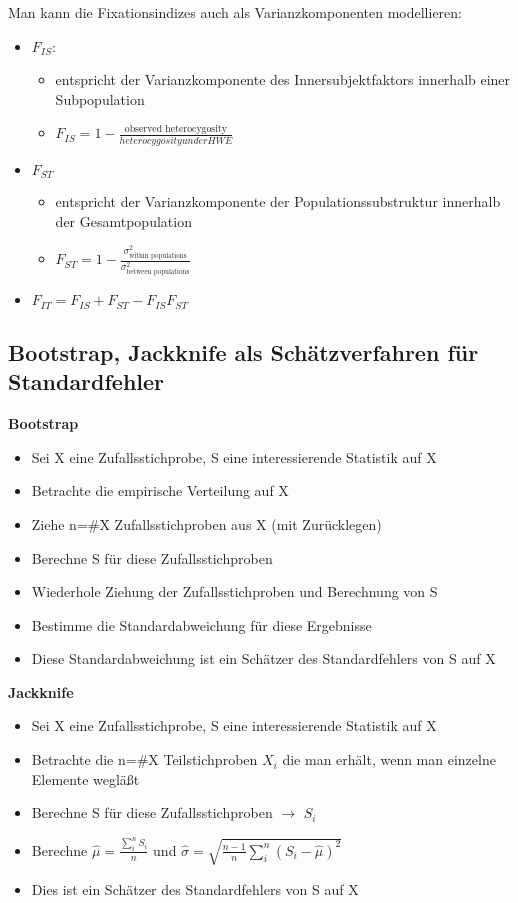 \newpage
Man kann die Fixationsindizes auch als Varianzkomponenten
modellieren:
\begin{itemize}
	\item $F_{IS}$:
	\begin{itemize}
		\item entspricht der Varianzkomponente des Innersubjektfaktors innerhalb einer Subpopulation
		\item $\displaystyle F_{IS}=1-\frac{\text{observed heterocygosity}}{heterocygosity under HWE}$
	\end{itemize}
	\item $F_{ST}$
	\begin{itemize}
		\item entspricht der Varianzkomponente der Populationssubstruktur innerhalb der Gesamtpopulation
		\item $\displaystyle F_{ST}=1-\frac{\sigma^2_{\text{within populations}}}{\sigma^2_{\text{between populations}}}$
	\end{itemize}
	\item $F_{IT}=F_{IS} + F_{ST} - F_{IS}F_{ST}$
\end{itemize}

\subsection{Bootstrap, Jackknife als Schätzverfahren für Standardfehler}
\textbf{Bootstrap}\\
\begin{itemize}
	\item Sei X eine Zufallsstichprobe, S eine interessierende Statistik auf X
	\item Betrachte die empirische Verteilung auf X
	\item Ziehe n=\#X Zufallsstichproben aus X (mit Zurücklegen)
	\item Berechne S für diese Zufallsstichproben
	\item Wiederhole Ziehung der Zufallsstichproben und Berechnung von S
	\item Bestimme die Standardabweichung für diese Ergebnisse
	\item Diese Standardabweichung ist ein Schätzer des Standardfehlers
von S auf X
\end{itemize}

\textbf{Jackknife}
\begin{itemize}
	\item Sei X eine Zufallsstichprobe, S eine interessierende Statistik auf X
	\item Betrachte die n=\#X Teilstichproben $X_i$ die man erhält, wenn man einzelne Elemente wegläßt
	\item Berechne S für diese Zufallsstichproben $\rightarrow$ $S_i$
	\item Berechne $\displaystyle \hat{\mu}=\frac{\sum_{i}^{n}S_i}{n}$ und $\hat{\sigma} = \sqrt{\frac{n-1}{n} \sum_{i}^{n} (S_i-\hat{\mu})^2}$
	\item Dies ist ein Schätzer des Standardfehlers von S auf X
\end{itemize}

